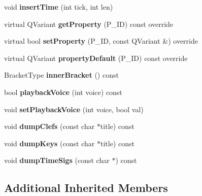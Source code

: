 \begin{DoxyCompactItemize}
\item 
\mbox{\label{class_ms_1_1_staff_a0fe38192ecff71cc2c575115e23c7ddc}} 
void {\bfseries insert\+Time} (int tick, int len)
\item 
\mbox{\label{class_ms_1_1_staff_a05f1cc86cf3e36b4df6778487011ddbf}} 
virtual Q\+Variant {\bfseries get\+Property} (P\+\_\+\+ID) const override
\item 
\mbox{\label{class_ms_1_1_staff_a83a48c91f11851f338a1087403044057}} 
virtual bool {\bfseries set\+Property} (P\+\_\+\+ID, const Q\+Variant \&) override
\item 
\mbox{\label{class_ms_1_1_staff_aa262ec304a274ddab4c64ab636951930}} 
virtual Q\+Variant {\bfseries property\+Default} (P\+\_\+\+ID) const override
\item 
\mbox{\label{class_ms_1_1_staff_a4ae9a4a0efe6c9286972137af3a0b224}} 
Bracket\+Type {\bfseries inner\+Bracket} () const
\item 
\mbox{\label{class_ms_1_1_staff_aed2c148aaac859010af2ab624e818a26}} 
bool {\bfseries playback\+Voice} (int voice) const
\item 
\mbox{\label{class_ms_1_1_staff_ad8fdbdbb9d3dc4baddebe27e7e80a766}} 
void {\bfseries set\+Playback\+Voice} (int voice, bool val)
\item 
\mbox{\label{class_ms_1_1_staff_a7197902f57ca8d2a6ed5c12edc1a653b}} 
void {\bfseries dump\+Clefs} (const char $\ast$title) const
\item 
\mbox{\label{class_ms_1_1_staff_a5b07586f6b7d8571e6b452065ad70a24}} 
void {\bfseries dump\+Keys} (const char $\ast$title) const
\item 
\mbox{\label{class_ms_1_1_staff_ae9df4b12046a14de840b517746655bec}} 
void {\bfseries dump\+Time\+Sigs} (const char $\ast$) const
\end{DoxyCompactItemize}
\subsection*{Additional Inherited Members}


